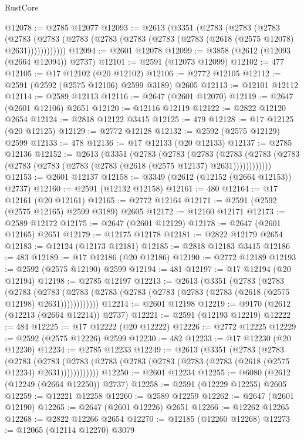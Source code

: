\begin{lexlean}{RustCore}
\begin{coremodule}
@12078 := @2785 @12077
@12093 := @2613
    (@3351
      (@2783
        (@2783
          (@2783
            (@2783 (@2783 (@2783 (@2783 (@2783 (@2783 (@2783 (@2618 (@2575 @12078) @2631))))))))))))
@12094 := @2601 @12078
@12099 := @3858 (@2612 (@12093 (@2664 @12094)) @2737)
@12101 := @2591 (@12073 @12099)
@12102 := 477
@12105 := @17 @12102 (@20 @12102)
@12106 := @2772 @12105
@12112 := @2591 (@2592 (@2575 @12106) @2599 @3189) @2605
@12113 := @12101 @12112
@12114 := @2589 @12113
@12116 := @2647 (@2601 @12070)
@12119 := @2647 (@2601 @12106) @2651
@12120 := @12116 @12119
@12122 := @2822 @12120 @2654
@12124 := @2818 @12122 @3415
@12125 := 479
@12128 := @17 @12125 (@20 @12125)
@12129 := @2772 @12128
@12132 := @2592 (@2575 @12129) @2599
@12133 := 478
@12136 := @17 @12133 (@20 @12133)
@12137 := @2785 @12136
@12152 := @2613
    (@3351
      (@2783
        (@2783
          (@2783
            (@2783 (@2783 (@2783 (@2783 (@2783 (@2783 (@2783 (@2618 (@2575 @12137) @2631))))))))))))
@12153 := @2601 @12137
@12158 := @3349 (@2612 (@12152 (@2664 @12153)) @2737)
@12160 := @2591 (@12132 @12158)
@12161 := 480
@12164 := @17 @12161 (@20 @12161)
@12165 := @2772 @12164
@12171 := @2591 (@2592 (@2575 @12165) @2599 @3189) @2605
@12172 := @12160 @12171
@12173 := @2589 @12172
@12175 := @2647 (@2601 @12129)
@12178 := @2647 (@2601 @12165) @2651
@12179 := @12175 @12178
@12181 := @2822 @12179 @2654
@12183 := @12124 (@12173 @12181)
@12185 := @2818 @12183 @3415
@12186 := 483
@12189 := @17 @12186 (@20 @12186)
@12190 := @2772 @12189
@12193 := @2592 (@2575 @12190) @2599
@12194 := 481
@12197 := @17 @12194 (@20 @12194)
@12198 := @2785 @12197
@12213 := @2613
    (@3351
      (@2783
        (@2783
          (@2783
            (@2783 (@2783 (@2783 (@2783 (@2783 (@2783 (@2783 (@2618 (@2575 @12198) @2631))))))))))))
@12214 := @2601 @12198
@12219 := @9170 (@2612 (@12213 (@2664 @12214)) @2737)
@12221 := @2591 (@12193 @12219)
@12222 := 484
@12225 := @17 @12222 (@20 @12222)
@12226 := @2772 @12225
@12229 := @2592 (@2575 @12226) @2599
@12230 := 482
@12233 := @17 @12230 (@20 @12230)
@12234 := @2785 @12233
@12249 := @2613
    (@3351
      (@2783
        (@2783
          (@2783
            (@2783 (@2783 (@2783 (@2783 (@2783 (@2783 (@2783 (@2618 (@2575 @12234) @2631))))))))))))
@12250 := @2601 @12234
@12255 := @6080 (@2612 (@12249 (@2664 @12250)) @2737)
@12258 := @2591 (@12229 @12255) @2605
@12259 := @12221 @12258
@12260 := @2589 @12259
@12262 := @2647 (@2601 @12190)
@12265 := @2647 (@2601 @12226) @2651
@12266 := @12262 @12265
@12268 := @2822 @12266 @2654
@12270 := @12185 (@12260 @12268)
@12273 := @12065 (@12114 @12270) @3079

\end{coremodule}
\end{lexlean}
